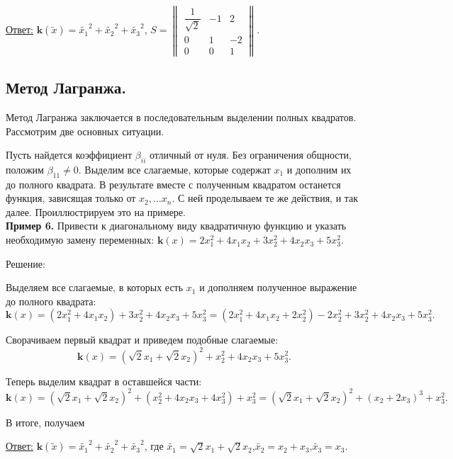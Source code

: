 \underline{Ответ:} $\mathbf{k}(\widetilde{x})=\widetilde{x_1}^2+\widetilde{x_2}^2+\widetilde{x_3}^2$, $S=\begin{Vmatrix}
\dfrac{1}{\sqrt{2}} & -1 & 2 \\
0 & 1 & -2 \\
0 & 0 & 1
\end{Vmatrix}$.\\

\subsection{Метод Лагранжа.}

Метод Лагранжа заключается в последовательным выделении полных квадратов. Рассмотрим две основных ситуации.

Пусть найдется коэффициент $\beta_{ii}$ отличный от нуля. Без ограничения общности, положим $\beta_{11}\neq0$. Выделим все слагаемые, которые содержат $x_1$ и дополним их до полного квадрата. В результате вместе с полученным квадратом останется функция, зависящая только от $x_2,\ldots x_n$. С ней проделываем те же действия, и так далее. Проиллюстрируем это на примере.\\

\textbf{Пример 6.} Привести к диагональному виду квадратичную функцию и указать необходимую замену переменных: $\mathbf{k}(x)=2x^2_1+4x_1x_2+3x^2_2+4x_2x_3+5x^2_3.$

\begin{center}
Решение:
\end{center}

Выделяем все слагаемые, в которых есть $x_1$ и дополняем полученное выражение до полного квадрата:$$\mathbf{k}(x)=(2x^2_1+4x_1x_2)+3x^2_2+4x_2x_3+5x^2_3=(2x^2_1+4x_1x_2+2x_2^2)-2x_2^2+3x^2_2+4x_2x_3+5x^2_3.$$

Сворачиваем первый квадрат и приведем подобные слагаемые:$$\mathbf{k}(x)=(\sqrt{2}x_1+\sqrt{2}x_2)^2+x_2^2+4x_2x_3+5x_3^2.$$

Теперь выделим квадрат в оставшейся части:$$\mathbf{k}(x)=(\sqrt{2}x_1+\sqrt{2}x_2)^2+(x_2^2+4x_2x_3+4x_3^2)+x_3^2=(\sqrt{2}x_1+\sqrt{2}x_2)^2+(x_2+2x_3)^3+x_3^2.$$

В итоге, получаем

\underline{Ответ:} $\mathbf{k}(\widetilde{x})=\widetilde{x_1}^2+\widetilde{x_2}^2+\widetilde{x_3}^2$, где $\widetilde{x_1}=\sqrt{2}x_1+\sqrt{2}x_2$,\hspace{8pt}$\widetilde{x_2}=x_2+x_3$,\hspace{8pt}$\widetilde{x_3}=x_3$.\\

